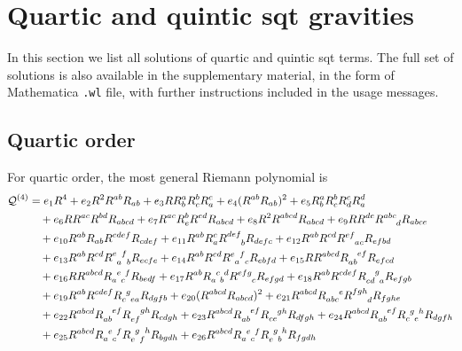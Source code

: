 \documentclass[a4paper,11pt]{article}
\begin{document}
\appendix
\allowdisplaybreaks
\section{Quartic and quintic \ac{sqt} gravities}
In this section we list all solutions of quartic and quintic \ac{sqt} terms. The full set of solutions is also available in the supplementary material, in the form of Mathematica \texttt{.wl} file, with further instructions included in the usage messages.

\subsection{Quartic order}
\label{sec:apdx-quartic-order}

For quartic order, the most general Riemann polynomial is
\begin{align}
    \mathcal Q^{(4)} & = 
        e_1 R^4 
        + e_2 R^2 R^{ab}R_{ab} 
        + e_3 RR^a_bR^b_c R^c_a
        + e_4 (R^{ab}R_{ab})^2
        + e_5 R^a_b R^b_c R^c_d R^d_a
        \nonumber\\& \quad + e_6 RR^{ac}R^{bd}R_{abcd}
        + e_7 R^{ac}R^b_e R^{ed} R_{abcd}
        + e_8 R^2 R^{abcd}R_{abcd}
        + e_9 RR^{de}R\indices{^a^b^c_d}R_{abce}
        \nonumber\\& \quad + e_{10} R^{ab}R_{ab}R^{cdef}R_{cdef}
        + e_{11} R^{ab}R_a^c R\indices{^d^e^f_b}R_{defc}
        + e_{12} R^{ab}R^{cd}R\indices{^e^f_a_c}R_{efbd}
        \nonumber\\& \quad + e_{13} R^{ab}R^{cd}R\indices{^e_a^f_b}R_{ecfe}
        + e_{14} R^{ab}R^{cd}R\indices{^e_a^f_c}R_{ebfd}
        + e_{15} RR^{abcd}R\indices{_a_b^e^f}R_{efcd}
        \nonumber\\& \quad + e_{16} RR^{abcd}R\indices{_a^e_c^f}R_{bedf}
        + e_{17} R^{ab}R\indices{_a^c_b^d}R\indices{^e^f^g_c}R_{efgd}
        + e_{18} R^{ab}R^{cdef}R\indices{_c_d^g_a}R_{efgb}
        \nonumber\\& \quad + e_{19} R^{ab}R^{cdef}R\indices{_c^g_e_a}R_{dgfb}
        + e_{20} (R^{abcd}R_{abcd})^2
        + e_{21} R^{abcd}R\indices{_a_b_c^e}R\indices{^f^g^h_d}R_{fghe}
        \nonumber\\& \quad + e_{22} R^{abcd}R\indices{_a_b^e^f}R\indices{_e_f^g^h}R_{cdgh}
        + e_{23} R^{abcd}R\indices{_a_b^e^f}R\indices{_c_e^g^h}R_{dfgh}
        + e_{24} R^{abcd}R\indices{_a_b^e^f}R\indices{_c^g_e^h}R_{dgfh}
        \nonumber\\& \quad + e_{25} R^{abcd}R\indices{_a^e_c^f}R\indices{_e^g_f^h}R_{bgdh}
        + e_{26} R^{abcd}R\indices{_a^e_c^f}R\indices{_e^g_b^h}R_{fgdh}
\end{align}
\end{document}
